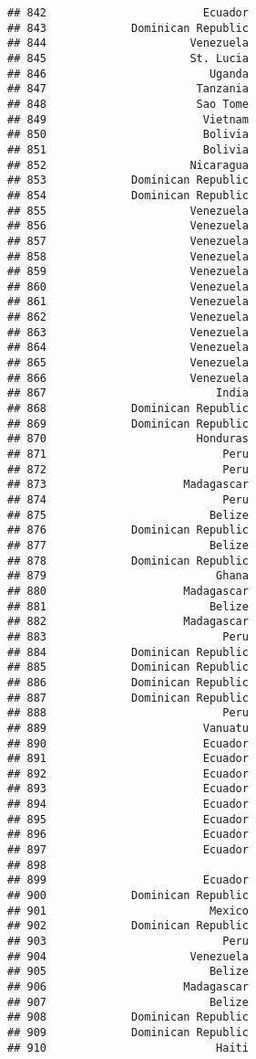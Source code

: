 \documentclass[
]{article}
\begin{document}
\begin{verbatim}
## 842                        Ecuador
## 843             Dominican Republic
## 844                      Venezuela
## 845                      St. Lucia
## 846                         Uganda
## 847                       Tanzania
## 848                       Sao Tome
## 849                        Vietnam
## 850                        Bolivia
## 851                        Bolivia
## 852                      Nicaragua
## 853             Dominican Republic
## 854             Dominican Republic
## 855                      Venezuela
## 856                      Venezuela
## 857                      Venezuela
## 858                      Venezuela
## 859                      Venezuela
## 860                      Venezuela
## 861                      Venezuela
## 862                      Venezuela
## 863                      Venezuela
## 864                      Venezuela
## 865                      Venezuela
## 866                      Venezuela
## 867                          India
## 868             Dominican Republic
## 869             Dominican Republic
## 870                       Honduras
## 871                           Peru
## 872                           Peru
## 873                     Madagascar
## 874                           Peru
## 875                         Belize
## 876             Dominican Republic
## 877                         Belize
## 878             Dominican Republic
## 879                          Ghana
## 880                     Madagascar
## 881                         Belize
## 882                     Madagascar
## 883                           Peru
## 884             Dominican Republic
## 885             Dominican Republic
## 886             Dominican Republic
## 887             Dominican Republic
## 888                           Peru
## 889                        Vanuatu
## 890                        Ecuador
## 891                        Ecuador
## 892                        Ecuador
## 893                        Ecuador
## 894                        Ecuador
## 895                        Ecuador
## 896                        Ecuador
## 897                        Ecuador
## 898                               
## 899                        Ecuador
## 900             Dominican Republic
## 901                         Mexico
## 902             Dominican Republic
## 903                           Peru
## 904                      Venezuela
## 905                         Belize
## 906                     Madagascar
## 907                         Belize
## 908             Dominican Republic
## 909             Dominican Republic
## 910                          Haiti

\end{verbatim}
\end{document}
